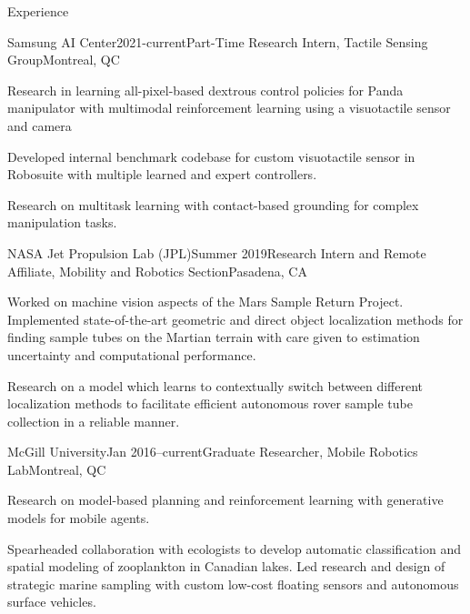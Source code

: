 \documentclass{resume} %
\begin{document}
\begin{rSection}{Experience}
\begin{rSubsection}{Samsung AI Center}{2021-current}{Part-Time Research Intern, Tactile Sensing Group}{Montreal, QC}
\item{Research in learning all-pixel-based dextrous control policies for Panda manipulator with multimodal reinforcement learning using a visuotactile sensor and camera}
\item{Developed internal benchmark codebase for custom visuotactile sensor in Robosuite with multiple learned and expert controllers. }
\item{Research on multitask learning with contact-based grounding for complex manipulation tasks. }
\end{rSubsection}
	\vspace{-.2cm}
\begin{rSubsection}{NASA Jet Propulsion Lab (JPL)}{Summer 2019}{Research Intern and Remote Affiliate, Mobility and Robotics Section}{Pasadena, CA}
\item{Worked on machine vision aspects of the Mars Sample Return Project. Implemented state-of-the-art geometric and direct object localization methods for finding sample tubes on the Martian terrain with care given to estimation uncertainty and computational performance.}
\item{Research on a model which learns to contextually switch between different localization methods to facilitate efficient autonomous rover sample tube collection in a reliable manner.}
\end{rSubsection}
	\vspace{-.2cm}
\begin{rSubsection}{McGill University}{Jan 2016--current}{Graduate Researcher, Mobile Robotics Lab}{Montreal, QC}
\item{Research on model-based planning and reinforcement learning with generative models for mobile agents.}
\item{Spearheaded collaboration with ecologists to develop automatic classification and spatial modeling of zooplankton in Canadian lakes. Led research and design of strategic marine sampling with custom low-cost floating sensors and autonomous surface vehicles.}

\end{rSubsection}
\end{rSection}
\end{document}
